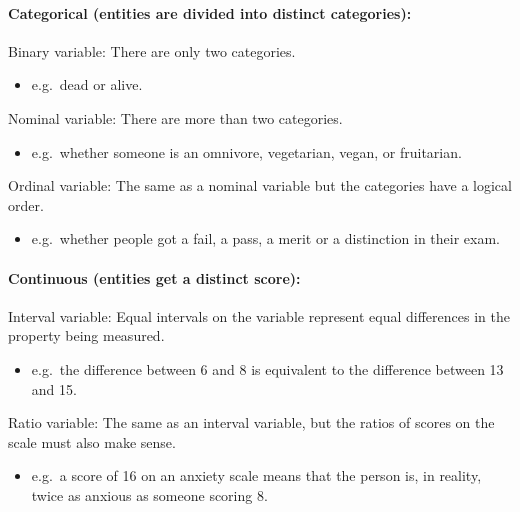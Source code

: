\documentclass[]{article}
\providecommand{\tightlist}{%
  \setlength{\itemsep}{0pt}\setlength{\parskip}{0pt}}
\let\oldparagraph\paragraph
\renewcommand{\paragraph}[1]{\oldparagraph{#1}\mbox{}}
\begin{document}
\hypertarget{categorical-entities-are-divided-into-distinct-categories}{%
\paragraph{Categorical (entities are divided into distinct
categories):}\label{categorical-entities-are-divided-into-distinct-categories}}

Binary variable: There are only two categories.

\begin{itemize}
\tightlist
\item
  e.g.~dead or alive.
\end{itemize}

Nominal variable: There are more than two categories.

\begin{itemize}
\tightlist
\item
  e.g.~whether someone is an omnivore, vegetarian, vegan, or fruitarian.
\end{itemize}

Ordinal variable: The same as a nominal variable but the categories have
a logical order.

\begin{itemize}
\tightlist
\item
  e.g.~whether people got a fail, a pass, a merit or a distinction in
  their exam.
\end{itemize}

\hypertarget{continuous-entities-get-a-distinct-score}{%
\paragraph{Continuous (entities get a distinct
score):}\label{continuous-entities-get-a-distinct-score}}

Interval variable: Equal intervals on the variable represent equal
differences in the property being measured.

\begin{itemize}
\tightlist
\item
  e.g.~the difference between 6 and 8 is equivalent to the difference
  between 13 and 15.
\end{itemize}

Ratio variable: The same as an interval variable, but the ratios of
scores on the scale must also make sense.

\begin{itemize}
\tightlist
\item
  e.g.~a score of 16 on an anxiety scale means that the person is, in
  reality, twice as anxious as someone scoring 8.
\end{itemize}
\end{document}
